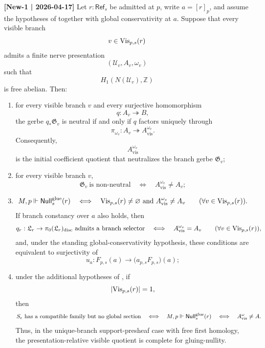 \begin{theorem}\label{thm:free-h1-quotient-completeness}
\textbf{[New-1 | 2026-04-17]}
Let $r:\mathsf{Ref}_s$ be admitted at $p$, write $a=[r]_p$, and assume the hypotheses of  together with global conservativity at $a$. Suppose that every visible branch
\[
v\in \mathrm{Vis}_{p,s}(r)
\]
admits a finite nerve presentation
\[
(\mathcal U_v,A_v,\omega_v)
\]
such that
\[
H_1(N(\mathcal U_v),\mathbb Z)
\]
is free abelian. Then:
\begin{enumerate}[label=(\roman*),nosep]
\item for every visible branch $v$ and every surjective homomorphism
\[
q:A_v\twoheadrightarrow B,
\]
the gerbe $q_*\mathfrak G_v$ is neutral if and only if $q$ factors uniquely through
\[
\pi_{\omega_v}:A_v\twoheadrightarrow A_{\mathrm{vis}}^{\omega_v}.
\]
Consequently,
\[
A_{\mathrm{vis}}^{\omega_v}
\]
is the initial coefficient quotient that neutralizes the branch gerbe $\mathfrak G_v$;
\item for every visible branch $v$,
\[
\mathfrak G_v\ \text{is non-neutral}
\quad\Longleftrightarrow\quad
A_{\mathrm{vis}}^{\omega_v}\neq A_v;
\]
\item
\[
M,p\Vdash \mathsf{Null}^{\mathrm{glue}}_s(r)
\quad\Longleftrightarrow\quad
\mathrm{Vis}_{p,s}(r)\neq\varnothing
\ \text{and}\
A_{\mathrm{vis}}^{\omega_v}\neq A_v
\qquad
(\forall v\in \mathrm{Vis}_{p,s}(r)).
\]
If branch constancy over $a$ also holds, then
\[
q_r:\mathfrak L_r\to \pi_0(\mathfrak L_r)_{\mathrm{disc}}
\ \text{admits a branch selector}
\quad\Longleftrightarrow\quad
A_{\mathrm{vis}}^{\omega_v}=A_v
\qquad
(\forall v\in \mathrm{Vis}_{p,s}(r)),
\]
and, under the standing global-conservativity hypothesis, these conditions are equivalent to surjectivity of
\[
u_a:F_{p,s}(a)\to \bigl(a_{p,s}F_{p,s}\bigr)(a);
\]
\item under the additional hypotheses of , if
\[
|\mathrm{Vis}_{p,s}(r)|=1,
\]
then
\[
S_e\ \text{has a compatible family but no global section}
\quad\Longleftrightarrow\quad
M,p\Vdash \mathsf{Null}^{\mathrm{glue}}_s(r)
\quad\Longleftrightarrow\quad
A_{\mathrm{vis}}^{\omega}\neq A.
\]
Thus, in the unique-branch support-presheaf case with free first homology, the presentation-relative visible quotient is complete for gluing-nullity.
\end{enumerate}
\end{theorem}

